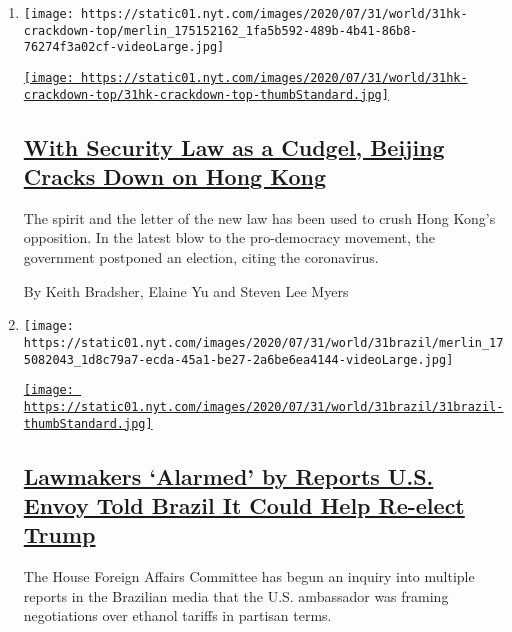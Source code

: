 \begin{enumerate}
\def\labelenumi{\arabic{enumi}.}
\item
  \texttt{[image: https://static01.nyt.com/images/2020/07/31/world/31hk-crackdown-top/merlin\_175152162\_1fa5b592-489b-4b41-86b8-76274f3a02cf-videoLarge.jpg]}

  \href{/2020/07/31/world/asia/hong-kong-election-national-security-law.html}{\texttt{[image: https://static01.nyt.com/images/2020/07/31/world/31hk-crackdown-top/31hk-crackdown-top-thumbStandard.jpg]}}

  \hypertarget{with-security-law-as-a-cudgel-beijing-cracks-down-on-hong-kong}{%
  \subsection{\texorpdfstring{\href{/2020/07/31/world/asia/hong-kong-election-national-security-law.html}{With
  Security Law as a Cudgel, Beijing Cracks Down on Hong
  Kong}}{With Security Law as a Cudgel, Beijing Cracks Down on Hong Kong}}\label{with-security-law-as-a-cudgel-beijing-cracks-down-on-hong-kong}}

  The spirit and the letter of the new law has been used to crush Hong
  Kong's opposition. In the latest blow to the pro-democracy movement,
  the government postponed an election, citing the coronavirus.

  By Keith Bradsher, Elaine Yu and Steven Lee Myers
\item
  \texttt{[image: https://static01.nyt.com/images/2020/07/31/world/31brazil/merlin\_175082043\_1d8c79a7-ecda-45a1-be27-2a6be6ea4144-videoLarge.jpg]}

  \href{/2020/07/31/world/americas/brazil-trump-ethanol-chapman.html}{\texttt{[image: https://static01.nyt.com/images/2020/07/31/world/31brazil/31brazil-thumbStandard.jpg]}}

  \hypertarget{lawmakers-alarmed-by-reports-us-envoy-told-brazil-it-could-help-re-elect-trump}{%
  \subsection{\texorpdfstring{\href{/2020/07/31/world/americas/brazil-trump-ethanol-chapman.html}{Lawmakers
  `Alarmed' by Reports U.S. Envoy Told Brazil It Could Help Re-elect
  Trump}}{Lawmakers `Alarmed' by Reports U.S. Envoy Told Brazil It Could Help Re-elect Trump}}\label{lawmakers-alarmed-by-reports-us-envoy-told-brazil-it-could-help-re-elect-trump}}

  The House Foreign Affairs Committee has begun an inquiry into multiple
  reports in the Brazilian media that the U.S. ambassador was framing
  negotiations over ethanol tariffs in partisan terms.


\end{enumerate}
